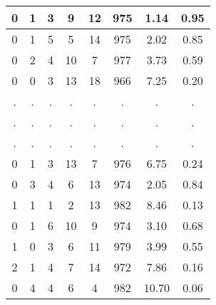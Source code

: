 \documentclass[12pt,a4paper]{article}
\begin{document}
\begin{center}
\begin{tabular}{|c|c|c|c|c|c|c|c|}
0 & 1 & 3 & 9 & 12 & 975 &  1.14 &  0.95\\ \hline
0 & 1 & 5 & 5 & 14 & 975 &  2.02 &  0.85\\ \hline
0 & 2 & 4 & 10 & 7 & 977 &  3.73 &  0.59\\ \hline
0 & 0 & 3 & 13 & 18 & 966 &  7.25 &  0.20\\ \hline
 . & . & . & . & . & . & . & .\\ \hline
 . & . & . & . & . & . & . & .\\ \hline
 . & . & . & . & . & . & . & .\\ \hline
0 & 1 & 3 & 13 & 7 & 976 &  6.75 &  0.24\\ \hline
0 & 3 & 4 & 6 & 13 & 974 &  2.05 &  0.84\\ \hline
1 & 1 & 1 & 2 & 13 & 982 &  8.46 &  0.13\\ \hline
0 & 1 & 6 & 10 & 9 & 974 &  3.10 &  0.68\\ \hline
1 & 0 & 3 & 6 & 11 & 979 &  3.99 &  0.55\\ \hline
2 & 1 & 4 & 7 & 14 & 972 &  7.86 &  0.16\\ \hline
0 & 4 & 4 & 6 & 4 & 982 & 10.70 &  0.06\\ \hline
\end{tabular}
\end{center}
\end{document}
